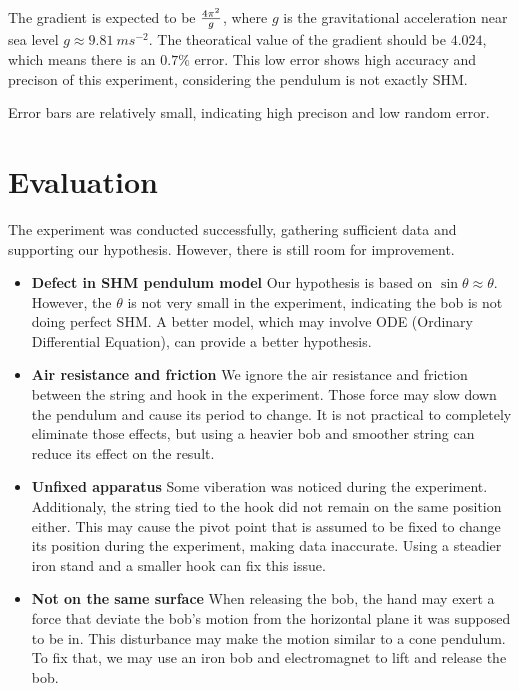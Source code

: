 \documentclass[a4paper]{article}
\begin{document}
The gradient is expected to be $4\pi^2 \over g$, where $g$ is the gravitational acceleration near sea level $g\approx \SI{9.81}{ms^{-2}}$. The theoratical value of the gradient should be $4.024$, which means there is an $0.7\%$ error. This low error shows high accuracy and precison of this experiment, considering the pendulum is not exactly SHM.

Error bars are relatively small, indicating high precison and low random error. 


\section{Evaluation}

The experiment was conducted successfully, gathering sufficient data and supporting our hypothesis. However, there is still room for improvement. 

\begin{itemize}
    \item \textbf{Defect in SHM pendulum model} Our hypothesis is based on $\sin\theta\approx\theta$. However, the $\theta$ is not very small in the experiment, indicating the bob is not doing perfect SHM. A better model, which may involve ODE (Ordinary Differential Equation), can provide a better hypothesis.
    \item \textbf{Air resistance and friction} We ignore the air resistance and friction between the string and hook in the experiment. Those force may slow down the pendulum and cause its period to change. It is not practical to completely eliminate those effects, but using a heavier bob and smoother string can reduce its effect on the result. 
    \item \textbf{Unfixed apparatus} Some viberation was noticed during the experiment. Additionaly, the string tied to the hook did not remain on the same position either. This may cause the pivot point that is assumed to be fixed to change its position during the experiment, making data inaccurate. Using a steadier iron stand and a smaller hook can fix this issue. 
    \item \textbf{Not on the same surface} When releasing the bob, the hand may exert a force that deviate the bob's motion from the horizontal plane it was supposed to be in. This disturbance may make the motion similar to a cone pendulum. To fix that, we may use an iron bob and electromagnet to lift and release the bob.
\end{itemize}
\end{document}
